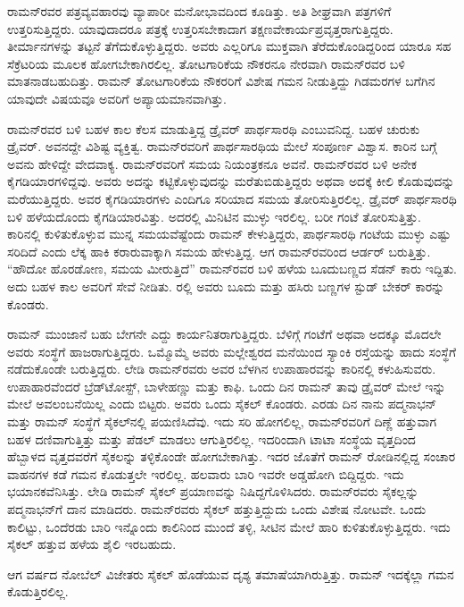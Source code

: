 ರಾಮನ್‍ರವರ ಪತ್ರವ್ಯವಹಾರವು ವ್ಯಾಪಾರೀ ಮನೋಭಾವದಿಂದ ಕೂಡಿತ್ತು. ಅತಿ ಶೀಘ್ರವಾಗಿ ಪತ್ರಗಳಿಗೆ ಉತ್ತರಿಸುತ್ತಿದ್ದರು. ಯಾವುದಾದರೂ ಪತ್ರಕ್ಕೆ ಉತ್ತರಿಸಬೇಕಾದಾಗ ತಕ್ಷಣವೇ\break ಕಾರ್ಯಪ್ರವೃತ್ತರಾಗುತ್ತಿದ್ದರು. ತೀರ್ಮಾನಗಳನ್ನು ತಟ್ಟನೆ ತೆಗೆದುಕೊಳ್ಳುತ್ತಿದ್ದರು. ಅವರು ಎಲ್ಲರಿಗೂ ಮುಕ್ತವಾಗಿ ತೆರೆದುಕೊಂಡಿದ್ದರಿಂದ ಯಾರೂ ಸಹ ಸೆಕ್ರೆಟರಿಯ ಮೂಲಕ ಹೋಗಬೇಕಾಗಿರಲಿಲ್ಲ. ತೋಟಗಾರಿಕೆಯ ನೌಕರನೂ ನೇರವಾಗಿ ರಾಮನ್‍ರವರ ಬಳಿ ಮಾತನಾಡಬಹುದಿತ್ತು. ರಾಮನ್ ತೋಟಗಾರಿಕೆಯ ನೌಕರರಿಗೆ ವಿಶೇಷ ಗಮನ ನೀಡುತ್ತಿದ್ದು ಗಿಡಮರಗಳ ಬಗೆಗಿನ ಯಾವುದೇ ವಿಷಯವೂ ಅವರಿಗೆ ಅಪ್ಯಾಯಮಾನವಾಗಿತ್ತು.

ರಾಮನ್‍ರವರ ಬಳಿ ಬಹಳ ಕಾಲ ಕೆಲಸ ಮಾಡುತ್ತಿದ್ದ ಡ್ರೈವರ್ ಪಾರ್ಥಸಾರಥಿ ಎಂಬುವನಿದ್ದ. ಬಹಳ ಚುರುಕು ಡ್ರೈವರ್. ಅವನದ್ದೇ ವಿಶಿಷ್ಟ ವ್ಯಕ್ತಿತ್ವ. ರಾಮನ್‍ರವರಿಗೆ ಪಾರ್ಥಸಾರಥಿಯ ಮೇಲೆ ಸಂಪೂರ್ಣ ವಿಶ್ವಾಸ. ಕಾರಿನ ಬಗ್ಗೆ ಅವನು ಹೇಳಿದ್ದೇ ವೇದವಾಕ್ಯ. ರಾಮನ್‍ರವರಿಗೆ ಸಮಯ ನಿಯಂತ್ರಕನೂ ಅವನೆ. ರಾಮನ್‍ರವರ ಬಳಿ ಅನೇಕ ಕೈಗಡಿಯಾರಗಳಿದ್ದವು. ಅವರು ಅದನ್ನು ಕಟ್ಟಿಕೊಳ್ಳುವುದನ್ನು ಮರೆತುಬಿಡುತ್ತಿದ್ದರು ಅಥವಾ ಅದಕ್ಕೆ ಕೀಲಿ ಕೊಡುವುದನ್ನು ಮರೆಯುತ್ತಿದ್ದರು. ಅವರ ಕೈಗಡಿಯಾರಗಳು ಎಂದಿಗೂ ಸರಿಯಾದ ಸಮಯ ತೋರಿಸುತ್ತಿರಲಿಲ್ಲ. ಡ್ರೈವರ್ ಪಾರ್ಥಸಾರಥಿ ಬಳಿ ಹಳೆಯದೊಂದು ಕೈಗಡಿಯಾರವಿತ್ತು. ಅದರಲ್ಲಿ ಮಿನಿಟಿನ ಮುಳ್ಳು ಇರಲಿಲ್ಲ. ಬರೀ ಗಂಟೆ ತೋರಿಸುತ್ತಿತ್ತು. ಕಾರಿನಲ್ಲಿ ಕುಳಿತುಕೊಳ್ಳುವ ಮುನ್ನ ಸಮಯವೆಷ್ಟೆಂದು ರಾಮನ್ ಕೇಳುತ್ತಿದ್ದರು, ಪಾರ್ಥಸಾರಥಿ ಗಂಟೆಯ ಮುಳ್ಳು ಎಷ್ಟು ಸರಿದಿದೆ ಎಂದು ಲೆಕ್ಕ ಹಾಕಿ ಕರಾರುವಾಕ್ಕಾಗಿ ಸಮಯ ಹೇಳುತ್ತಿದ್ದ. ಆಗ ರಾಮನ್‍ರವರಿಂದ ಆರ್ಡರ್ ಬರುತ್ತಿತ್ತು. “ಹೌದೋ ಹೊರಡೋಣ, ಸಮಯ ಮೀರುತ್ತಿದೆ” ರಾಮನ್‍ರವರ ಬಳಿ ಹಳೆಯ ಬೂದುಬಣ್ಣದ ಸೆಡನ್ ಕಾರು ಇದ್ದಿತು. ಅದು ಬಹಳ ಕಾಲ ಅವರಿಗೆ ಸೇವೆ ನೀಡಿತು. ರಲ್ಲಿ ಅವರು ಬೂದು ಮತ್ತು ಹಸಿರು ಬಣ್ಣಗಳ ಸ್ಟುಡ್ ಬೇಕರ್ ಕಾರನ್ನು ಕೊಂಡರು.

ರಾಮನ್ ಮುಂಜಾನೆ ಬಹು ಬೇಗನೇ ಎದ್ದು ಕಾರ್ಯನಿತರಾಗುತ್ತಿದ್ದರು. ಬೆಳಿಗ್ಗೆ  ಗಂಟೆಗೆ ಅಥವಾ ಅದಕ್ಕೂ ಮೊದಲೇ ಅವರು ಸಂಸ್ಥೆಗೆ ಹಾಜರಾಗುತ್ತಿದ್ದರು. ಒಮ್ಮೊಮ್ಮೆ ಅವರು ಮಲ್ಲೇಶ್ವರದ ಮನೆಯಿಂದ ಸ್ಯಾಂಕಿ ರಸ್ತೆಯನ್ನು ಹಾದು ಸಂಸ್ಥೆಗೆ ನಡೆದುಕೊಂಡೇ ಬರುತ್ತಿದ್ದರು. ಲೇಡಿ ರಾಮನ್‍\-ರವರು ಅವರ ಬೆಳಗಿನ ಉಪಾಹಾರವನ್ನು ಕಾರಿನಲ್ಲಿ ಕಳುಹಿಸುವರು. ಉಪಾಹಾರವೆಂದರೆ ಬ್ರೆಡ್‍ಟೋಸ್ಟ್, ಬಾಳೇಹಣ್ಣು ಮತ್ತು ಕಾಫಿ. ಒಂದು ದಿನ ರಾಮನ್ ತಾವು ಡ್ರೈವರ್ ಮೇಲೆ ಇನ್ನು ಮೇಲೆ ಅವಲಂಬನೆಯಿಲ್ಲ ಎಂದು ಬಿಟ್ಟರು. ಅವರು ಒಂದು ಸೈಕಲ್ ಕೊಂಡರು. ಎರಡು ದಿನ ನಾನು ಪದ್ಮನಾಭನ್ ಮತ್ತು ರಾಮನ್ ಸಂಸ್ಥೆಗೆ ಸೈಕಲ್‍ನಲ್ಲಿ ಪಯಣಿಸಿದೆವು. ಇದು ಸರಿ ಹೋಗಲಿಲ್ಲ, ರಾಮನ್‍ರವರಿಗೆ ದಿಣ್ಣೆ ಹತ್ತುವಾಗ ಬಹಳ ದಣಿವಾಗುತ್ತಿತ್ತು ಮತ್ತು ಪೆಡಲ್ ಮಾಡಲು ಆಗುತ್ತಿರಲಿಲ್ಲ. ಇದರಿಂದಾಗಿ ಟಾಟಾ ಸಂಸ್ಥೆಯ ವೃತ್ತದಿಂದ ಹೆಬ್ಬಾಳದ ವೃತ್ತದವರೆಗೆ ಸೈಕಲನ್ನು ತಳ್ಳಿಕೊಂಡೇ ಹೋಗಬೇಕಾಗಿತ್ತು. ಇದರ ಜೊತೆಗೆ ರಾಮನ್ ರೋಡಿನಲ್ಲಿದ್ದ ಸಂಚಾರ ವಾಹನಗಳ ಕಡೆ ಗಮನ ಕೊಡುತ್ತಲೇ ಇರಲಿಲ್ಲ. ಹಲವಾರು ಬಾರಿ ಇವರೇ ಅಡ್ಡಹೋಗಿ ಬಿದ್ದಿದ್ದರು. ಇದು ಭಯಾನಕವೆನಿಸಿತ್ತು. ಲೇಡಿ ರಾಮನ್ ಸೈಕಲ್ ಪ್ರಯಾಣವನ್ನು ನಿಷಿದ್ದಗೊಳಿಸಿದರು. ರಾಮನ್‍ರವರು ಸೈಕಲ್ಲನ್ನು ಪದ್ಮನಾಭನ್‍ಗೆ ದಾನ ಮಾಡಿದರು. ರಾಮನ್‍ರವರು ಸೈಕಲ್ ಹತ್ತುತ್ತಿದ್ದುದು ಒಂದು ವಿಶೇಷ ನೋಟವೇ. ಒಂದು ಕಾಲಿಟ್ಟು, ಒಂದೆರಡು ಬಾರಿ ಇನ್ನೊಂದು ಕಾಲಿನಿಂದ ಮುಂದೆ ತಳ್ಳಿ, ಸೀಟಿನ ಮೇಲೆ ಹಾರಿ ಕುಳಿತುಕೊಳ್ಳುತ್ತಿದ್ದರು. ಇದು ಸೈಕಲ್ ಹತ್ತುವ ಹಳೆಯ ಶೈಲಿ ಇರಬಹುದು.

ಆಗ  ವರ್ಷದ ನೋಬೆಲ್ ವಿಜೇತರು ಸೈಕಲ್ ಹೊಡೆಯುವ ದೃಶ್ಯ ತಮಾಷೆಯಾಗಿರುತ್ತಿತ್ತು. ರಾಮನ್ ಇದಕ್ಕೆಲ್ಲಾ ಗಮನ ಕೊಡುತ್ತಿರಲಿಲ್ಲ.

